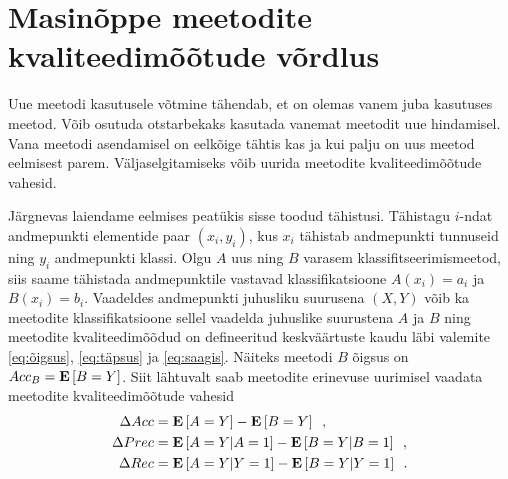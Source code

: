 \section{Masinõppe meetodite kvaliteedimõõtude võrdlus}
Uue meetodi kasutusele võtmine tähendab, et on olemas vanem juba kasutuses meetod. Võib osutuda otstarbekaks kasutada vanemat meetodit uue hindamisel. Vana meetodi asendamisel on eelkõige tähtis kas ja kui palju on uus meetod eelmisest parem. Väljaselgitamiseks võib uurida meetodite kvaliteedimõõtude vahesid.

Järgnevas laiendame eelmises peatükis sisse toodud tähistusi. Tähistagu $i$-ndat andmepunkti elementide paar $(x_i, y_i)$, kus $x_i$ tähistab andmepunkti tunnuseid ning $y_i$ andmepunkti klassi. Olgu $A$ uus ning $B$ varasem klassifitseerimismeetod, siis saame tähistada andmepunktile vastavad klassifikatsioone  $A(x_i)=a_i$ ja $B(x_i)=b_i$. Vaadeldes andmepunkti juhusliku suurusena $(X, Y)$ võib ka meetodite klassifikatsioone sellel vaadelda juhuslike suurustena $A$ ja $B$ ning meetodite kvaliteedimõõdud on defineeritud keskväärtuste kaudu läbi valemite \eqref{eq:õigsus}, \eqref{eq:täpsus} ja \eqref{eq:saagis}. Näiteks meetodi $B$ õigsus on $Acc_B=\operatorname*{\mathbf{E}}\left[B=Y\right]$. Siit lähtuvalt saab meetodite erinevuse uurimisel vaadata meetodite kvaliteedimõõtude vahesid
\begin{align}
    \Delta Acc&=\operatorname*{\mathbf{E}}\left[A=Y\right]-\operatorname*{\mathbf{E}}\left[B=Y\right] \enspace, \label{eq:õigsus vahe} \\
    \Delta Prec&=\operatorname*{\mathbf{E}}\left[A=Y|A=1\right]-\operatorname*{\mathbf{E}}\left[B=Y|B=1\right] \enspace, \label{eq:täpsus vahe} \\
    \Delta Rec&=\operatorname*{\mathbf{E}}\left[A=Y|Y=1\right]-\operatorname*{\mathbf{E}}\left[B=Y|Y=1\right] \enspace. \label{eq:saagis vahe}
\end{align}

